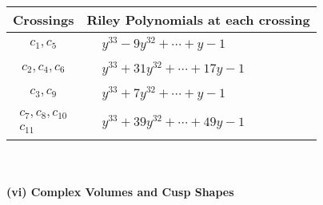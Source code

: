 \documentclass[1p]{elsarticle_modified}
\theoremstyle{definition}
\begin{document}
\begin{tabular}{m{50pt}|m{274pt}}
Crossings & \hspace{64pt}Riley Polynomials at each crossing \\
\hline $$\begin{aligned}c_{1},c_{5}\end{aligned}$$&$\begin{aligned}
&y^{33}-9 y^{32}+\cdots+y-1
\end{aligned}$\\
\hline $$\begin{aligned}c_{2},c_{4},c_{6}\end{aligned}$$&$\begin{aligned}
&y^{33}+31 y^{32}+\cdots+17 y-1
\end{aligned}$\\
\hline $$\begin{aligned}c_{3},c_{9}\end{aligned}$$&$\begin{aligned}
&y^{33}+7 y^{32}+\cdots+y-1
\end{aligned}$\\
\hline $$\begin{aligned}c_{7},c_{8},c_{10}\\c_{11}\end{aligned}$$&$\begin{aligned}
&y^{33}+39 y^{32}+\cdots+49 y-1
\end{aligned}$\\
\hline
\end{tabular}\\~\\
\newpage\flushleft \textbf{(vi) Complex Volumes and Cusp Shapes}
\end{document}
